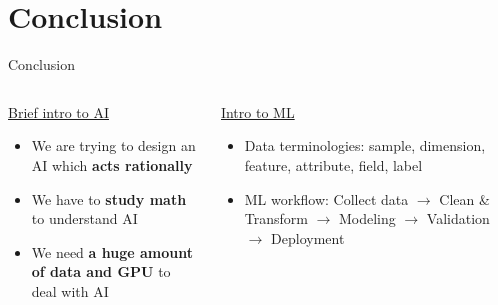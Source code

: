 \section{Conclusion}

\begin{frame}{Conclusion}
    \begin{columns}
        \begin{column}{0.5\textwidth}
            \begin{center}
                \uline{Brief intro to AI}
            \end{center}

            \begin{itemize}
                \item We are trying to design an AI which \textbf{acts rationally}
                \item We have to \textbf{study math} to understand AI
                \item We need \textbf{a huge amount of data and GPU} to deal with AI
            \end{itemize}
        \end{column}

        \begin{column}{0.5\textwidth}
            \begin{center}
                \uline{Intro to ML}
            \end{center}

            \begin{itemize}
                \item Data terminologies: sample, dimension, feature, attribute, field, label
                \item ML workflow: Collect data $\to$ Clean \& Transform $\to$ Modeling $\to$ Validation $\to$ Deployment
            \end{itemize}
        \end{column}
    \end{columns}
\end{frame}
